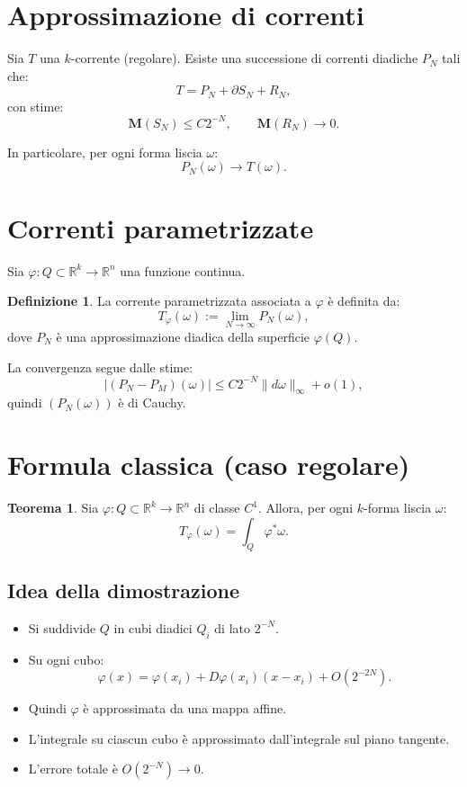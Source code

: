 \documentclass[a4paper,11pt]{article}
\theoremstyle{definition}
\newtheorem{definition}{Definizione}
\newtheorem{theorem}{Teorema}
\begin{document}
\section{Approssimazione di correnti}

Sia $T$ una $k$-corrente (regolare). Esiste una successione di correnti diadiche $P_N$
tali che:
\[
T = P_N + \partial S_N + R_N,
\]
con stime:
\[
\mathbf{M}(S_N) \le C 2^{-N}, \qquad \mathbf{M}(R_N) \to 0.
\]

In particolare, per ogni forma liscia $\omega$:
\[
P_N(\omega) \to T(\omega).
\]

\section{Correnti parametrizzate}

Sia $\varphi : Q \subset \mathbb{R}^k \to \mathbb{R}^n$ una funzione continua.

\begin{definition}
La corrente parametrizzata associata a $\varphi$ è definita da:
\[
T_\varphi(\omega) := \lim_{N\to\infty} P_N(\omega),
\]
dove $P_N$ è una approssimazione diadica della superficie $\varphi(Q)$.
\end{definition}

La convergenza segue dalle stime:
\[
|(P_N - P_M)(\omega)| \le C 2^{-N} \|d\omega\|_\infty + o(1),
\]
quindi $(P_N(\omega))$ è di Cauchy.

\section{Formula classica (caso regolare)}

\begin{theorem}
Sia $\varphi : Q \subset \mathbb{R}^k \to \mathbb{R}^n$ di classe $C^1$.
Allora, per ogni $k$-forma liscia $\omega$:
\[
T_\varphi(\omega) = \int_Q \varphi^* \omega.
\]
\end{theorem}

\subsection*{Idea della dimostrazione}

\begin{itemize}
\item Si suddivide $Q$ in cubi diadici $Q_i$ di lato $2^{-N}$.
\item Su ogni cubo:
\[
\varphi(x) = \varphi(x_i) + D\varphi(x_i)(x-x_i) + O(2^{-2N}).
\]
\item Quindi $\varphi$ è approssimata da una mappa affine.
\item L'integrale su ciascun cubo è approssimato dall'integrale sul piano tangente.
\item L'errore totale è $O(2^{-N}) \to 0$.
\end{itemize}
\end{document}

